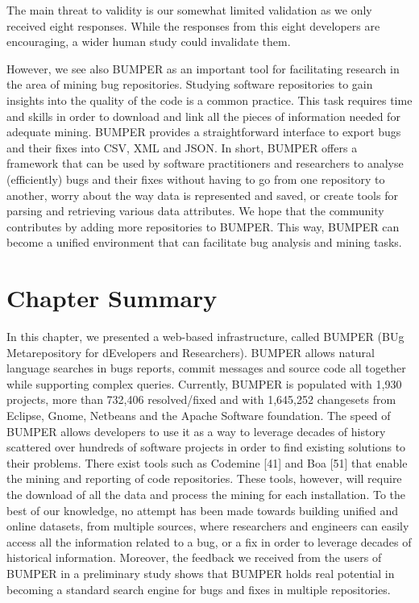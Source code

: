 \documentclass[12pt]{report}
\begin{document}
The main threat to validity is our somewhat limited validation as we
only received eight responses. While the responses from this eight
developers are encouraging, a wider human study could invalidate them.

However, we see also BUMPER as an important tool for facilitating
research in the area of mining bug repositories. Studying software
repositories to gain insights into the quality of the code is a common
practice. This task requires time and skills in order to download and
link all the pieces of information needed for adequate mining. BUMPER
provides a straightforward interface to export bugs and their fixes into
CSV, XML and JSON. In short, BUMPER offers a framework that can be used
by software practitioners and researchers to analyse (efficiently) bugs
and their fixes without having to go from one repository to another,
worry about the way data is represented and saved, or create tools for
parsing and retrieving various data attributes. We hope that the
community contributes by adding more repositories to BUMPER. This way,
BUMPER can become a unified environment that can facilitate bug analysis
and mining tasks.

\section{Chapter Summary}\label{chapter-summary}

In this chapter, we presented a web-based infrastructure, called BUMPER
(BUg Metarepository for dEvelopers and Researchers). BUMPER allows
natural language searches in bugs reports, commit messages and source
code all together while supporting complex queries. Currently, BUMPER is
populated with 1,930 projects, more than 732,406 resolved/fixed and with
1,645,252 changesets from Eclipse, Gnome, Netbeans and the Apache
Software foundation. The speed of BUMPER allows developers to use it as
a way to leverage decades of history scattered over hundreds of software
projects in order to find existing solutions to their problems. There
exist tools such as Codemine {[}41{]} and Boa {[}51{]} that enable the
mining and reporting of code repositories. These tools, however, will
require the download of all the data and process the mining for each
installation. To the best of our knowledge, no attempt has been made
towards building unified and online datasets, from multiple sources,
where researchers and engineers can easily access all the information
related to a bug, or a fix in order to leverage decades of historical
information. Moreover, the feedback we received from the users of BUMPER
in a preliminary study shows that BUMPER holds real potential in
becoming a standard search engine for bugs and fixes in multiple
repositories.
\end{document}
